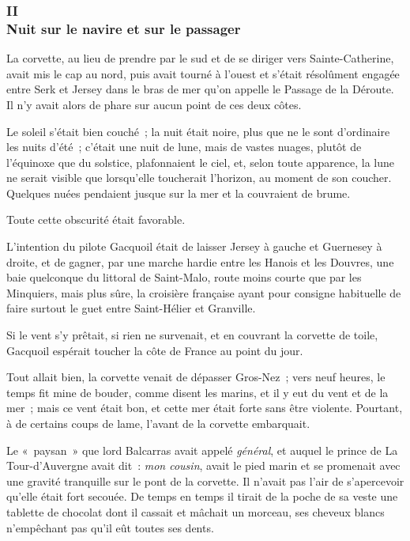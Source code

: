 \documentclass[french,twoside]{book} %
\begin{document}
 \subsubsection[{II. Nuit sur le navire et sur le passager}]{II \\
Nuit sur le navire et sur le passager}
\label{p1l2c2}
\noindent La corvette, au lieu de prendre par le sud et de se diriger vers Sainte-Catherine, avait mis le cap au nord, puis avait tourné à l’ouest et s’était résolûment engagée entre Serk et Jersey dans le bras de mer qu’on appelle le Passage de la Déroute. Il n’y avait alors de phare sur aucun point de ces deux côtes.\par
Le soleil s’était bien couché ; la nuit était noire, plus que ne le sont d’ordinaire les nuits d’été ; c’était une nuit de lune, mais de vastes nuages, plutôt de l’équinoxe que du solstice, plafonnaient le ciel, et, selon toute apparence, la lune ne serait visible que lorsqu’elle toucherait l’horizon, au moment de son coucher. Quelques nuées pendaient jusque sur la mer et la couvraient de brume.\par
Toute cette obscurité était favorable.\par
L’intention du pilote Gacquoil était de laisser Jersey à gauche et Guernesey à droite, et de gagner, par une marche hardie entre les Hanois et les Douvres, une baie quelconque du littoral de Saint-Malo, route moins courte que par les Minquiers, mais plus  sûre, la croisière française ayant pour consigne habituelle de faire surtout le guet entre Saint-Hélier et Granville.\par
Si le vent s’y prêtait, si rien ne survenait, et en couvrant la corvette de toile, Gacquoil espérait toucher la côte de France au point du jour.\par
Tout allait bien, la corvette venait de dépasser Gros-Nez ; vers neuf heures, le temps fit mine de bouder, comme disent les marins, et il y eut du vent et de la mer ; mais ce vent était bon, et cette mer était forte sans être violente. Pourtant, à de certains coups de lame, l’avant de la corvette embarquait.\par
Le « paysan » que lord Balcarras avait appelé \emph{général}, et auquel le prince de La Tour-d’Auvergne avait dit : \emph{mon cousin}, avait le pied marin et se promenait avec une gravité tranquille sur le pont de la corvette. Il n’avait pas l’air de s’apercevoir qu’elle était fort secouée. De temps en temps il tirait de la poche de sa veste une tablette de chocolat dont il cassait et mâchait un morceau, ses cheveux blancs n’empêchant pas qu’il eût toutes ses dents.\par
\end{document}
